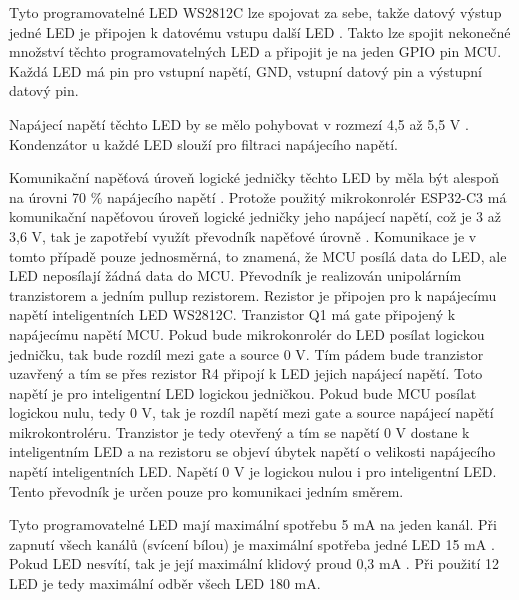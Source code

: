 Tyto programovatelné LED WS2812C lze spojovat za sebe, takže datový výstup jedné LED je připojen k datovému vstupu další 
LED \cite{WS2812C_dtsh}. Takto lze spojit nekonečné množství těchto programovatelných LED a připojit je na jeden GPIO pin MCU. 
Každá LED má pin pro vstupní napětí, GND, vstupní datový pin a výstupní datový pin. 

Napájecí napětí těchto LED by se mělo pohybovat v rozmezí 4,5 až 5,5 V \cite{WS2812C_dtsh}. Kondenzátor u každé LED slouží pro 
filtraci napájecího napětí. 



Komunikační napěťová úroveň logické jedničky těchto LED by měla být alespoň na úrovni 70 \% napájecího napětí \cite{WS2812C_dtsh}. 
Protože použitý mikrokonrolér ESP32-C3 má komunikační napěťovou úroveň logické jedničky jeho napájecí napětí, což je 3 až 3,6 V, 
tak je zapotřebí využít převodník napěťové úrovně \cite{ESP_C3_dtsh}. Komunikace je v tomto případě pouze jednosměrná, 
to znamená, že MCU posílá data do LED, ale LED neposílají žádná data do MCU. Převodník je realizován unipolárním tranzistorem 
a jedním pullup rezistorem. Rezistor je připojen pro k napájecímu napětí inteligentních LED WS2812C. 
Tranzistor Q1 má gate připojený k napájecímu napětí MCU. Pokud bude mikrokonrolér do LED posílat logickou jedničku, tak bude rozdíl
mezi gate a source 0 V. Tím pádem bude tranzistor uzavřený a tím se přes rezistor R4 připojí k LED jejich napájecí napětí. Toto napětí 
je pro inteligentní LED logickou jedničkou. Pokud bude MCU posílat logickou nulu, tedy 0 V, tak je rozdíl napětí mezi gate a source 
napájecí napětí mikrokontroléru. Tranzistor je tedy otevřený a tím se napětí 0 V dostane k inteligentním LED a na rezistoru se objeví
úbytek napětí o velikosti napájecího napětí inteligentních LED. Napětí 0 V je logickou nulou i pro inteligentní LED. Tento převodník
je určen pouze pro komunikaci jedním směrem. 


Tyto programovatelné LED mají maximální spotřebu 5 mA na jeden kanál. Při zapnutí všech kanálů (svícení bílou) je maximální
spotřeba jedné LED 15 mA \cite{WS2812C_dtsh}. Pokud LED nesvítí, tak je její maximální klidový proud 0,3 mA \cite{WS2812C_dtsh}.
Při použití 12 LED je tedy maximální odběr všech LED 180 mA.




